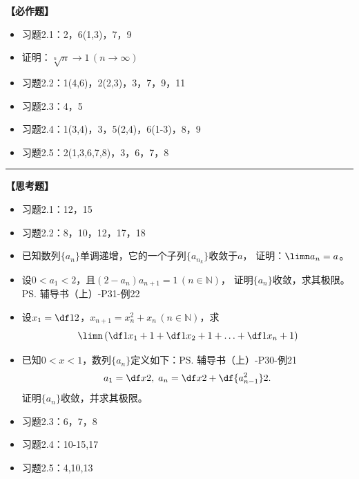 {\bf 【必作题】}

\begin{itemize}
  \item 习题2.1：2，6(1,3)，7，9
  \item 证明：$\sqrt[n]n\to 1\,(n\to\infty)$
  \item 习题2.2：1(4,6)，2(2,3)，3，7，9，11
  \item 习题2.3：4，5
  \item 习题2.4：1(3,4)，3，5(2,4)，6(1-3)，8，9
  \item 习题2.5：2(1,3,6,7,8)，3，6，7，8
\end{itemize}

\bigskip

\hrule

\bigskip
\bigskip

{\bf 【思考题】}

\begin{itemize}
  \item 习题2.1：12，15
  \item 习题2.2：8，10，12，17，18
  \item 已知数列$\{a_n\}$单调递增，它的一个子列$\{a_{n_k}\}$收敛于$a$，
  证明：$\limn a_n=a$。
  \item 设$0<a_1<2$，且$(2-a_n)a_{n+1}=1\,(n\in\mathbb{N})$，
  	证明$\{a_n\}$收敛，求其极限。\ps{辅导书（上）-P31-例22}\\
  \item 设$x_1=\df 12$，$x_{n+1}=x_n^2+x_n\,(n\in\mathbb{N})$，求
	$$\limn\left(\df 1{x_1+1}+\df 1{x_2+1}+\ldots+\df
	1{x_n+1}\right)$$
  \item 已知$0<x<1$，数列$\{a_n\}$定义如下：\ps{辅导书（上）-P30-例21}
	$$a_1=\df x2,\;a_n=\df x2+\df{a_{n-1}^2}2.$$
	证明$\{a_n\}$收敛，并求其极限。
  \item 习题2.3：6，7，8
  \item 习题2.4：10-15,17
  \item 习题2.5：4,10,13
\end{itemize}
% 
\newpage

